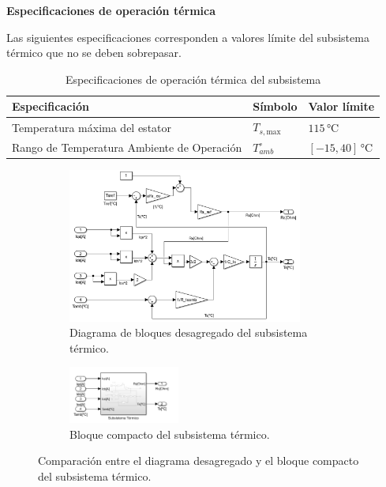 \documentclass{article}
\begin{document}
\textbf{Especificaciones de operación térmica}

Las siguientes especificaciones corresponden a valores límite del subsistema térmico que no se deben sobrepasar.

\begin{table}[H]
\centering
\label{tabla_especificaciones_termicas}
\begin{tabular}{|l|l|l|}
\hline
\textbf{Especificación} & \textbf{Símbolo} & \textbf{Valor límite} \\ \hline
Temperatura máxima del estator & $T_{s, \text{max}}$ & $115 \, \text{°C}$ \\ \hline
Rango de Temperatura Ambiente de Operación & $T^\circ_{amb}$ & $[-15,40]\,\text{°C}$ \\ \hline
\end{tabular}
\caption{Especificaciones de operación térmica del subsistema}
\end{table}

\begin{figure}[H]
    \centering
    \begin{subfigure}[t]{\textwidth}
        \centering
        \includegraphics[width=0.85\textwidth]{Imagenes/BloquesSistTermico.png}
        \caption{Diagrama de bloques desagregado del subsistema térmico.}
        \label{fig:bloques_termico_desagregado}
    \end{subfigure}
    
    \vspace{0.5cm} %
    
    \begin{subfigure}[t]{\textwidth}
        \centering
        \includegraphics[width=0.4\textwidth]{Imagenes/CompactoSistTermico.png}
        \caption{Bloque compacto del subsistema térmico.}
        \label{fig:bloques_termico_compacto}
    \end{subfigure}
    
    \caption{Comparación entre el diagrama desagregado y el bloque compacto del subsistema térmico.}
    \label{fig:bloques_termico}
\end{figure}
\end{document}

